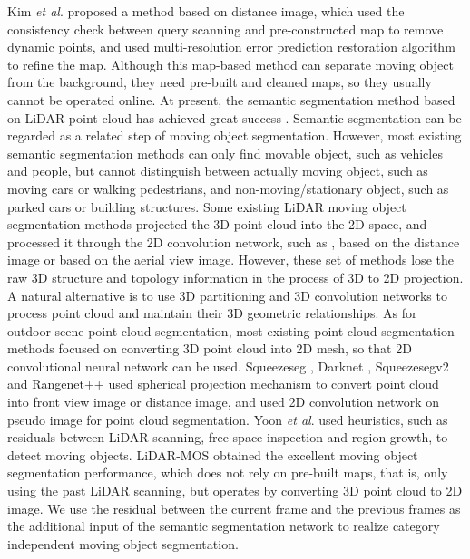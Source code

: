 \documentclass[lettersize,journal]{IEEEtran}
\begin{document}
Kim \emph{et al}. \cite{kim2020remove} proposed a method based on distance image, which used the consistency check between query scanning and pre-constructed map to remove dynamic points, and used multi-resolution error prediction restoration algorithm to refine the map. Although this map-based method can separate moving object from the background, they need pre-built and cleaned maps, so they usually cannot be operated online. At present, the semantic segmentation method based on LiDAR point cloud has achieved great success  \cite{zhu2021cylindrical,hu2020randla,cortinhal2020salsanext,li2021rethinking, du2022novel, corcoran2011background}. Semantic segmentation can be regarded as a related step of moving object segmentation. However, most existing semantic segmentation methods can only find movable object, such as vehicles and people, but cannot distinguish between actually moving object, such as moving cars or walking pedestrians, and non-moving/stationary object, such as parked cars or building structures. Some existing LiDAR moving object segmentation methods projected the 3D point cloud into the 2D space, and processed it through the 2D convolution network, such as  \cite{alonso20203d,milioto2019rangenet++}, based on the distance image or based on the aerial view image. However, these set of methods lose the raw 3D structure and topology information in the process of 3D to 2D projection. A natural alternative is to use 3D partitioning and 3D convolution networks to process point cloud and maintain their 3D geometric relationships. As for outdoor scene point cloud segmentation, most existing point cloud segmentation methods \cite{hu2020randla,cortinhal2020salsanext,milioto2019rangenet++,zhang2020deep} focused on converting 3D point cloud into 2D mesh, so that 2D convolutional neural network can be used. Squeezeseg \cite{wu2018squeezeseg}, Darknet  \cite{behley2019semantickitti}, Squeezesegv2 \cite{wu2019squeezesegv2} and Rangenet++ \cite{milioto2019rangenet++} used spherical projection mechanism to convert point cloud into front view image or distance image, and used 2D convolution network on pseudo image for point cloud segmentation. Yoon \emph{et al}. \cite{yoon2019mapless} used heuristics, such as residuals between LiDAR scanning, free space inspection and region growth, to detect moving objects. LiDAR-MOS \cite{chen2021moving} obtained the excellent moving object segmentation performance, which does not rely on pre-built maps, that is, only using the past LiDAR scanning, but operates by converting 3D point cloud to 2D image. We use the residual between the current frame and the previous frames as the additional input of the semantic segmentation network to realize category independent moving object segmentation. 
\end{document}
